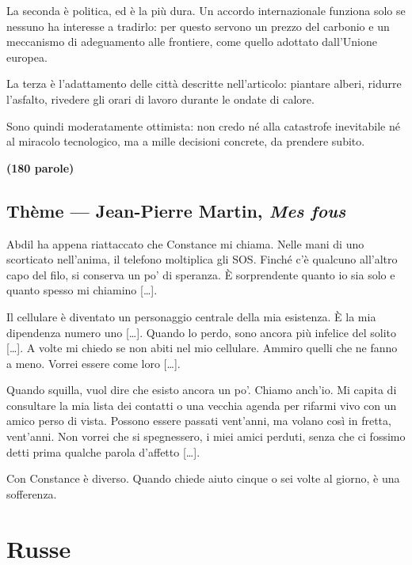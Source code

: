 \documentclass[11pt,a4paper]{article}
\begin{document}
La seconda è politica, ed è la più dura. Un accordo internazionale funziona solo se nessuno ha interesse a tradirlo: per questo servono un prezzo del carbonio e un meccanismo di adeguamento alle frontiere, come quello adottato dall'Unione europea.

La terza è l'adattamento delle città descritte nell'articolo: piantare alberi, ridurre l'asfalto, rivedere gli orari di lavoro durante le ondate di calore.

Sono quindi moderatamente ottimista: non credo né alla catastrofe inevitabile né al miracolo tecnologico, ma a mille decisioni concrete, da prendere subito.

\textbf{(180 parole)}

\hypertarget{thuxe8me-jean-pierre-martin-mes-fous}{%
\subsection{\texorpdfstring{Thème --- Jean-Pierre Martin, \emph{Mes fous}}{Thème --- Jean-Pierre Martin, Mes fous}}\label{thuxe8me-jean-pierre-martin-mes-fous}}

Abdil ha appena riattaccato che Constance mi chiama. Nelle mani di uno scorticato nell'anima, il telefono moltiplica gli SOS. Finché c'è qualcuno all'altro capo del filo, si conserva un po' di speranza. È sorprendente quanto io sia solo e quanto spesso mi chiamino {[}\ldots{]}.

Il cellulare è diventato un personaggio centrale della mia esistenza. È la mia dipendenza numero uno {[}\ldots{]}. Quando lo perdo, sono ancora più infelice del solito {[}\ldots{]}. A volte mi chiedo se non abiti nel mio cellulare. Ammiro quelli che ne fanno a meno. Vorrei essere come loro {[}\ldots{]}.

Quando squilla, vuol dire che esisto ancora un po'. Chiamo anch'io. Mi capita di consultare la mia lista dei contatti o una vecchia agenda per rifarmi vivo con un amico perso di vista. Possono essere passati vent'anni, ma volano così in fretta, vent'anni. Non vorrei che si spegnessero, i miei amici perduti, senza che ci fossimo detti prima qualche parola d'affetto {[}\ldots{]}.

Con Constance è diverso. Quando chiede aiuto cinque o sei volte al giorno, è una sofferenza.

\hypertarget{russe}{%
\section{Russe}\label{russe}}
\end{document}

